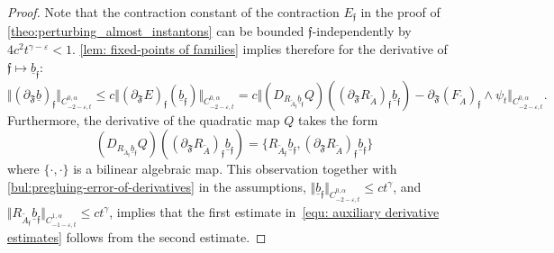 \documentclass[11pt,a4paper]{scrartcl}
\newcommand{\VertWHt}[3]{\Vert_{C^{{#1},\alpha}_{{#2},t}{#3}}}
\numberwithin{equation}{section}
\theoremstyle{plain}
\theoremstyle{definition}
\theoremstyle{remark}
\begin{document}
\begin{proof}
Note that the contraction constant of the contraction $E_{\mathfrak{f}}$ in the proof of \autoref{theo:perturbing_almost_instantons} can be bounded $\mathfrak{f}$-independently by $4c^2t^{\gamma-\varepsilon} <1$. \autoref{lem: fixed-points of families} implies therefore for the derivative of $\mathfrak{f} \mapsto \underline{b}_{\mathfrak{f}}$: \[ \Vert (\partial_\mathfrak{F}\underline{b})_{\mathfrak{f}} \VertWHt{0}{-2-\varepsilon}{} \leq c \Vert (\partial_\mathfrak{F}E)_{\mathfrak{f}}(\underline{b}_{\mathfrak{f}}) \VertWHt{0}{-2-\varepsilon}{} = c \Vert (D_{R_{\tilde{A}_{\mathfrak{f}}}\underline{b}_{\mathfrak{f}}}Q)((\partial_\mathfrak{F}R_{\tilde{A}})_{\mathfrak{f}}\underline{b}_{\mathfrak{f}}) - \partial_\mathfrak{F} (F_{\tilde{A}})_{\mathfrak{f}} \wedge \psi_t \VertWHt{0}{-2-\varepsilon}{}. \] 
Furthermore, the derivative of the quadratic map $Q$ takes the form \[(D_{R_{\tilde{A}_{\mathfrak{f}}}\underline{b}_{\mathfrak{f}}}Q)((\partial_\mathfrak{F}R_{\tilde{A}})_{\mathfrak{f}}\underline{b}_{\mathfrak{f}}) = \{R_{\tilde{A}_{\mathfrak{f}}}\underline{b}_{\mathfrak{f}},(\partial_\mathfrak{F}R_{\tilde{A}})_{\mathfrak{f}} \underline{b}_{\mathfrak{f}}\}\] where $\{ \cdot,\cdot\}$ is a bilinear algebraic map. This observation together with \autoref{bul:pregluing-error-of-derivatives} in the assumptions, $\Vert \underline{b}_\mathfrak{f} \VertWHt{0}{-2-\varepsilon}{} \leq ct^\gamma$, and $\Vert R_{\tilde{A}_{\mathfrak{f}}} \underline{b}_{\mathfrak{f}} \VertWHt{1}{-1-\varepsilon}{} \leq c t^\gamma$, implies that the first estimate in~\eqref{equ: auxiliary derivative estimates} follows from the second estimate.


\end{proof}
\end{document}
